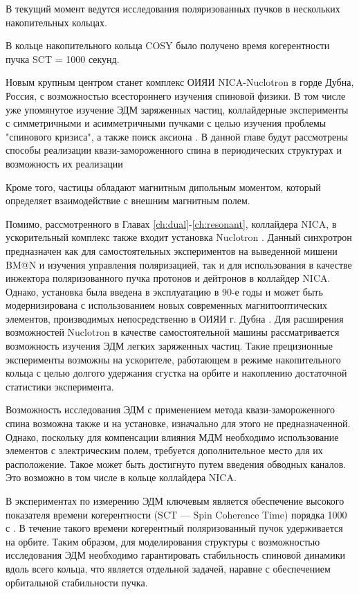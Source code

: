 В текущий момент ведутся исследования поляризованных пучков в нескольких накопительных кольцах.

В кольце накопительного кольца COSY было получено время когерентности пучка SCT = 1000 секунд.

Новым крупным центром станет комплекс ОИЯИ NICA-Nuclotron в горде Дубна, Россия, с возможностью всестороннего изучения спиновой физики. В том числе уже упомянутое изучение ЭДМ заряженных частиц, коллайдерные эксперименты с симметричными и асимметричными пучками с целью изучения проблемы "спинового кризиса"\cite{ST_Filatov}, а также поиск аксиона \cite{Axion_Nikolaev}. В данной главе будут рассмотрены способы реализации квази-замороженного спина в периодических структурах и возможность их реализации 

Кроме того, частицы обладают магнитным дипольным моментом, который определяет взаимодействие с внешним магнитным полем.



\par Помимо, рассмотренного в Главах \ref{ch:dual}-\ref{ch:resonant}, коллайдера NICA, в ускорительный комплекс также входит установка Nuclotron \cite{nuclotron24}. Данный синхротрон предназначен как для самостоятельных экспериментов на выведенной мишени BM@N и изучения управления поляризацией, так и для использования в качестве инжектора поляризованного пучка протонов и дейтронов в коллайдер NICA. Однако, установка была введена в эксплуатацию в 90-е годы \cite{baldin:nuclotron} и может быть модернизирована с использованием новых современных магнитооптических элементов, производимых непосредственно в ОИЯИ г. Дубна \cite{korovkin:nica_magnets}. Для расширения возможностей Nuclotron в качестве самостоятельной машины рассматривается возможность изучения ЭДМ легких заряженных частиц. Такие прецизионные эксперименты возможны на ускорителе, работающем в режиме накопительного кольца с целью долгого удержания сгустка на орбите и накоплению достаточной статистики эксперимента. 

\par Возможность исследования ЭДМ с применением метода квази-замороженного спина возможна также и на установке, изначально для этого не предназначенной. Однако, поскольку для компенсации влияния МДМ необходимо использование элементов с электрическим полем, требуется дополнительное место для их расположение. Такое может быть достигнуто путем введения обводных каналов. Это возможно в том числе в кольце коллайдера NICA.

\par В экспериментах по измерению ЭДМ ключевым является обеспечение высокого показателя времени когерентности (SCT — Spin Coherence Time) порядка 1000 с \cite{AGSproposal}. В течение такого времени когерентный поляризованный пучок удерживается на орбите. Таким образом, для моделирования структуры с возможностью исследования ЭДМ необходимо гарантировать стабильность спиновой динамики вдоль всего кольца, что является отдельной задачей, наравне с обеспечением орбитальной стабильности пучка.

